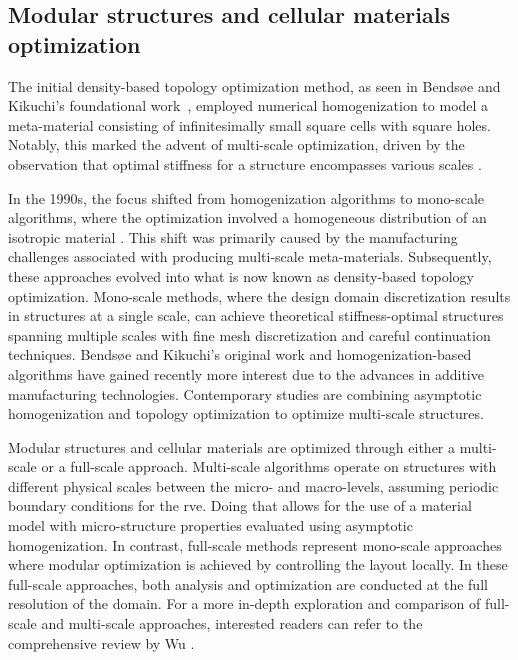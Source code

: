 \subsection{Modular structures and cellular materials optimization}
The initial density-based topology optimization method, as seen in Bendsøe and Kikuchi's foundational work~, employed numerical homogenization to model a meta-material consisting of infinitesimally small square cells with square holes. Notably, this marked the advent of multi-scale optimization, driven by the observation that optimal stiffness for a structure encompasses various scales .

In the 1990s, the focus shifted from homogenization algorithms to mono-scale algorithms, where the optimization involved a homogeneous distribution of an isotropic material . This shift was primarily caused by the manufacturing challenges associated with producing multi-scale meta-materials. Subsequently, these approaches evolved into what is now known as density-based topology optimization. Mono-scale methods, where the design domain discretization results in structures at a single scale, can achieve theoretical stiffness-optimal structures spanning multiple scales with fine mesh discretization and careful continuation techniques. Bendsøe and Kikuchi's original work and homogenization-based algorithms have gained recently more interest due to the advances in additive manufacturing technologies. Contemporary studies are combining asymptotic homogenization and topology optimization to optimize multi-scale structures. 

Modular structures and cellular materials are optimized through either a multi-scale or a full-scale approach. Multi-scale algorithms operate on structures with different physical scales between the micro- and macro-levels, assuming periodic boundary conditions for the \gls{rve}. Doing that allows for the use of a material model with micro-structure properties evaluated using asymptotic homogenization. In contrast, full-scale methods represent mono-scale approaches where modular optimization is achieved by controlling the layout locally. In these full-scale approaches, both analysis and optimization are conducted at the full resolution of the domain. For a more in-depth exploration and comparison of full-scale and multi-scale approaches, interested readers can refer to the comprehensive review by Wu \etal {}.

